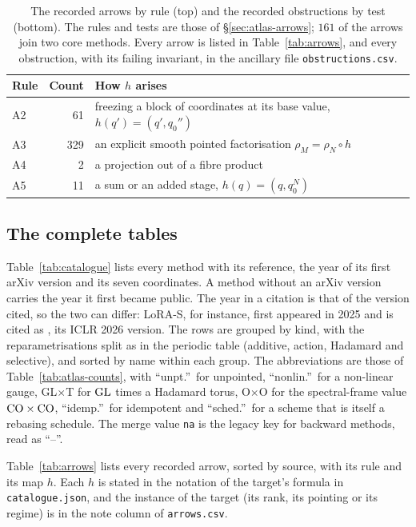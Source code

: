 \begin{table}[t]
\centering\footnotesize
\caption{The \nArrows{} recorded arrows by rule (top) and the \nObstructions{} recorded obstructions by test (bottom).
The rules and tests are those of \S\ref{sec:atlas-arrows}; $161$ of the arrows join two core methods. Every arrow is
listed in Table~\ref{tab:arrows}, and every obstruction, with its failing invariant, in the ancillary file
\texttt{obstructions.csv}.}\label{tab:app-rules-tests}
\begin{tabularx}{\linewidth}{@{}lrX@{}}\toprule\headrow
\textbf{Rule} & \textbf{Count} & \textbf{How $h$ arises}\\\midrule
A2 & 61 & freezing a block of coordinates at its base value, $h(q')=(q',q_0'')$\\
A3 & 329 & an explicit smooth pointed factorisation $\rho_M=\rho_N\circ h$\\
A4 & 2 & a projection out of a fibre product\\
A5 & 11 & a sum or an added stage, $h(q)=(q,q_0^N)$\\
\bottomrule\end{tabularx}

\medskip

\end{table}

\subsection{The complete tables}\label{app:catalogue-tables}

Table~\ref{tab:catalogue} lists every method with its reference, the year of its first arXiv version and its seven
coordinates. A method without an arXiv version carries the year it first became public. The year in a citation is that
of the version cited, so the two can differ: LoRA-S, for instance, first appeared in 2025 and is cited as
\citet{zheng2025lora}, its ICLR 2026 version. The rows are grouped by kind, with the reparametrisations split as in the periodic table (additive, action,
Hadamard and selective), and sorted by name within each group. The abbreviations are those of
Table~\ref{tab:atlas-counts}, with ``unpt.''\ for unpointed, ``nonlin.''\ for a non-linear gauge, GL$\times$T for
$\mathrm{GL}$ times a Hadamard torus, O$\times$O for the spectral-frame value $\mathrm{CO}\times\mathrm{CO}$, ``idemp.''\ for idempotent and
``sched.''\ for a scheme that is itself a rebasing schedule. The merge value \texttt{na} is the legacy key for
backward methods, read as ``--''.

Table~\ref{tab:arrows} lists every recorded arrow, sorted by source, with its rule and its map $h$. Each $h$ is stated
in the notation of the target's formula in \texttt{catalogue.json}, and the instance of the target (its rank, its
pointing or its regime) is in the note column of \texttt{arrows.csv}.




